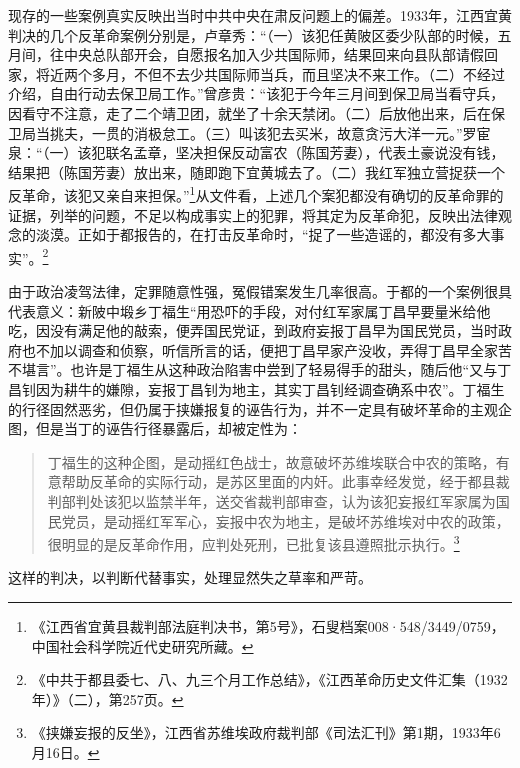现存的一些案例真实反映出当时中共中央在肃反问题上的偏差。1933年，江西宜黄判决的几个反革命案例分别是，卢章秀：“（一）该犯任黄陂区委少队部的时候，五月间，往中央总队部开会，自愿报名加入少共国际师，结果回来向县队部请假回家，将近两个多月，不但不去少共国际师当兵，而且坚决不来工作。（二）不经过介绍，自由行动去保卫局工作。”曾彦贵：“该犯于今年三月间到保卫局当看守兵，因看守不注意，走了二个靖卫团，就坐了十余天禁闭。（二）后放他出来，后在保卫局当挑夫，一贯的消极怠工。（三）叫该犯去买米，故意贪污大洋一元。”罗宦泉：“（一）该犯联名孟章，坚决担保反动富农（陈国芳妻），代表土豪说没有钱，结果把（陈国芳妻）放出来，随即跑下宜黄城去了。（二）我红军独立营捉获一个反革命，该犯又亲自来担保。”\footnote{《江西省宜黄县裁判部法庭判决书，第5号》，石叟档案008·548/3449/0759，中国社会科学院近代史研究所藏。}从文件看，上述几个案犯都没有确切的反革命罪的证据，列举的问题，不足以构成事实上的犯罪，将其定为反革命犯，反映出法律观念的淡漠。正如于都报告的，在打击反革命时，“捉了一些造谣的，都没有多大事实”。\footnote{《中共于都县委七、八、九三个月工作总结》，《江西革命历史文件汇集（1932年）》（二），第257页。}


由于政治凌驾法律，定罪随意性强，冤假错案发生几率很高。于都的一个案例很具代表意义：新陂中塅乡丁福生“用恐吓的手段，对付红军家属丁昌早要量米给他吃，因没有满足他的敲索，便弄国民党证，到政府妄报丁昌早为国民党员，当时政府也不加以调查和侦察，听信所言的话，便把丁昌早家产没收，弄得丁昌早全家苦不堪言”。也许是丁福生从这种政治陷害中尝到了轻易得手的甜头，随后他“又与丁昌钊因为耕牛的嫌隙，妄报丁昌钊为地主，其实丁昌钊经调查确系中农”。丁福生的行径固然恶劣，但仍属于挟嫌报复的诬告行为，并不一定具有破坏革命的主观企图，但是当丁的诬告行径暴露后，却被定性为：

\begin{quote}

丁福生的这种企图，是动摇红色战士，故意破坏苏维埃联合中农的策略，有意帮助反革命的实际行动，是苏区里面的内奸。此事幸经发觉，经于都县裁判部判处该犯以监禁半年，送交省裁判部审查，认为该犯妄报红军家属为国民党员，是动摇红军军心，妄报中农为地主，是破坏苏维埃对中农的政策，很明显的是反革命作用，应判处死刑，已批复该县遵照批示执行。\footnote{《挟嫌妄报的反坐》，江西省苏维埃政府裁判部《司法汇刊》第1期，1933年6月16日。}
\end{quote}


这样的判决，以判断代替事实，处理显然失之草率和严苛。


